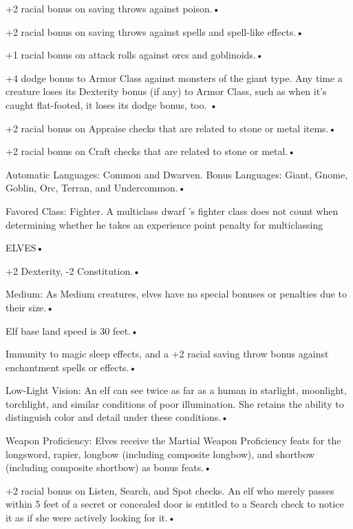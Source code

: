 \documentclass{article}
\begin{document}
+2 racial bonus on saving throws against poison.• 

\parindent=7pt
+2 racial bonus on saving throws against spells and spell-like effects.• 

\parindent=3pt
+1 racial bonus on attack rolls against orcs and goblinoids.• 

+4 dodge bonus to Armor Class against monsters of the giant type. Any time a creature 
loses its Dexterity bonus (if any) to Armor Class, such as when it's caught flat-footed, 
it loses its dodge bonus, too. • 

\parindent=7pt
+2 racial bonus on Appraise checks that are related to stone or metal items.• 

\parindent=3pt
+2 racial bonus on Craft checks that are related to stone or metal.• 

Automatic Languages: Common and Dwarven. Bonus Languages: Giant, Gnome, Goblin, 
Orc, Terran, and Undercommon.• 

\parindent=7pt
Favored Class: Fighter. A multiclass dwarf 's fighter class does not count when 
determining whether he takes an experience point penalty for multiclassing

\vspace{12pt}
\parindent=0pt
{\LARGE{}ELVES• }

\parindent=3pt
+2 Dexterity, -2 Constitution.• 

Medium: As Medium creatures, elves have no special bonuses or penalties due to 
their size.• 

\parindent=7pt
Elf base land speed is 30 feet.• 

\parindent=3pt
Immunity to magic sleep effects, and a +2 racial saving throw bonus against enchantment 
spells or effects.• 

Low-Light Vision: An elf can see twice as far as a human in starlight, moonlight, 
torchlight, and similar conditions of poor illumination. She retains the ability 
to distinguish color and detail under these conditions.• 

\parindent=7pt
Weapon Proficiency: Elves receive the Martial Weapon Proficiency feats for the 
longsword, rapier, longbow (including composite longbow), and shortbow (including 
composite shortbow) as bonus feats.• 

\parindent=3pt
+2 racial bonus on Listen, Search, and Spot checks. An elf who merely passes within 
5 feet of a secret or concealed door is entitled to a Search check to notice it 
as if she were actively looking for it.• 
\end{document}
